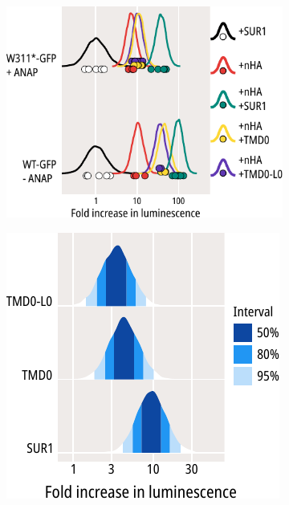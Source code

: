 \begin{figure}[hbtp]
	\centering
	\begin{subfigure}[t]{0.5\textwidth}
		\caption{}\label{ch6fig:tmd0s_surface_expression_1}
		\centering
		\includegraphics[width=\textwidth]{tmd0s_surface_expression_1.pdf}
	\end{subfigure}
	\hfill
	\begin{subfigure}[t]{0.4\textwidth}
		\caption{}\label{ch6fig:tmd0s_surface_expression_2}
		\centering
		\includegraphics[width=\textwidth]{tmd0s_surface_expression_3.pdf}

\end{subfigure}
\end{figure}
